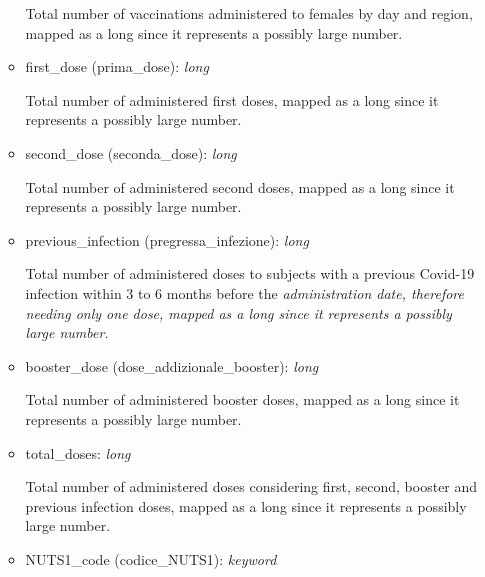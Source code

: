 \documentclass[12pt, a4paper]{article}
\begin{document}
\begin{itemize}
\begin{itemize}
        \begin{footnotesize}
          Total number of vaccinations administered to females by day and region, mapped
          as a long since it represents a possibly large number.
        \end{footnotesize}
      \item first\_dose (prima\_dose): \emph{long} \\
        \begin{footnotesize}
          Total number of administered first doses, mapped as a long since it represents
          a possibly large number.
        \end{footnotesize}
      \item second\_dose (seconda\_dose): \emph{long} \\
        \begin{footnotesize}
          Total number of administered second doses, mapped as a long since it represents
          a possibly large number.
        \end{footnotesize}
      \item previous\_infection (pregressa\_infezione): \emph{long} \\
        \begin{footnotesize}
          Total number of administered doses to subjects with a previous Covid-19 
          infection within 3 to 6 months before the \it{administration date}, therefore 
          needing only one dose, mapped as a long since it represents a possibly large 
          number. 
        \end{footnotesize}
      \item booster\_dose (dose\_addizionale\_booster): \emph{long} \\
        \begin{footnotesize}
          Total number of administered booster doses, mapped as a long since it 
          represents a possibly large number.
        \end{footnotesize}
      \item total\_doses: \emph{long} \\
        \begin{footnotesize}
          Total number of administered doses considering first, second, booster and previous 
          infection doses, mapped as a long since it represents a possibly large number.
        \end{footnotesize}
      \item NUTS1\_code (codice\_NUTS1): \emph{keyword} \\

\end{itemize}
\end{itemize}
\end{document}
